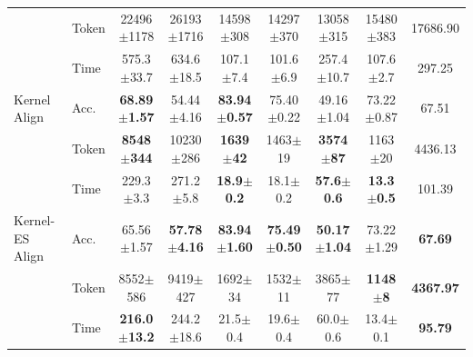 \documentclass{article} %
\begin{document}
\begin{table}[t]
{{\begin{tabular}{@{}ll*{7}{c}@{}}
 & Token & 22496$\pm$1178 & 26193$\pm$1716 & 14598$\pm$308 & 14297$\pm$370 & 13058$\pm$315 & 15480$\pm$383 & 17686.90 \\
 & Time & 575.3$\pm$33.7 & 634.6$\pm$18.5 & 107.1$\pm$7.4 & 101.6$\pm$6.9 & 257.4$\pm$10.7 & 107.6$\pm$2.7 & 297.25 \\
\midrule
Kernel Align & Acc. & \textbf{68.89$\pm$1.57} & 54.44$\pm$4.16 & \textbf{83.94$\pm$0.57} & 75.40$\pm$0.22 & 49.16$\pm$1.04 & 73.22$\pm$0.87 & 67.51 \\
 & Token & \textbf{8548$\pm$344} & 10230$\pm$286 & \textbf{1639$\pm$42} & 1463$\pm$19 & \textbf{3574$\pm$87} & 1163$\pm$20 & 4436.13 \\
 & Time & 229.3$\pm$3.3 & 271.2$\pm$5.8 & \textbf{18.9$\pm$0.2} & 18.1$\pm$0.2 & \textbf{57.6$\pm$0.6} & \textbf{13.3$\pm$0.5} & 101.39 \\
\midrule
Kernel-ES Align & Acc. & 65.56$\pm$1.57 & \textbf{57.78$\pm$4.16} & \textbf{83.94$\pm$1.60} & \textbf{75.49$\pm$0.50} & \textbf{50.17$\pm$1.04} & 73.22$\pm$1.29 & \textbf{67.69} \\
 & Token & 8552$\pm$586 & 9419$\pm$427 & 1692$\pm$34 & 1532$\pm$11 & 3865$\pm$77 & \textbf{1148$\pm$8} & \textbf{4367.97} \\
 & Time & \textbf{216.0$\pm$13.2} & 244.2$\pm$18.6 & 21.5$\pm$0.4 & 19.6$\pm$0.4 & 60.0$\pm$0.6 & 13.4$\pm$0.1 & \textbf{95.79} \\
\bottomrule
\end{tabular}%
}%
}
\end{table}
\end{document}
